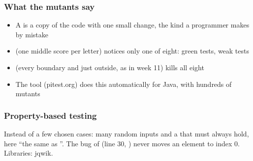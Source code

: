 \documentclass[aspectratio=169,10pt,compress]{beamer}
\begin{document}
\begin{frame}[t,fragile] \frametitle{What the mutants say}

	\begin{itemize}\footnotesize
		\item A  is a copy of the code with one small change, the kind a programmer makes by mistake
		\item {} (one middle score per letter) notices only one of eight: green tests, weak tests
		\item {} (every boundary and just outside, as in week 11) kills all eight
		\item The tool  (pitest.org) does this automatically for Java, with hundreds of mutants
	\end{itemize}
\end{frame}




\begin{frame}[t,fragile] \frametitle{Property-based testing}

	\footnotesize Instead of a few chosen cases: many random inputs and a  that must always hold, here ``the same as
	''. The bug of  (line 30, ) never moves an element to index 0. Libraries: jqwik.
\end{frame}




\end{document}
